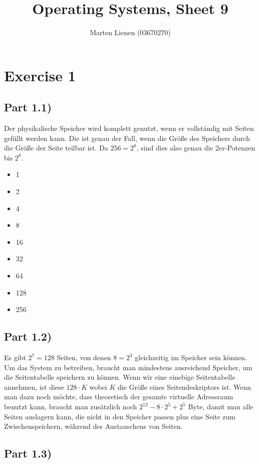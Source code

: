 \documentclass[10pt,a4paper]{article}
\title{Operating Systems, Sheet 9}
\author{Marten Lienen (03670270)}
\begin{document}
\maketitle

\section*{Exercise 1}

\subsection*{Part 1.1)}

Der physikalische Speicher wird komplett genutzt, wenn er vollständig mit Seiten gefüllt werden kann.
Die ist genau der Fall, wenn die Größe des Speichers durch die Größe der Seite teilbar ist.
Da $256 = 2^{8}$, sind dies also genau die $2$er-Potenzen bis $2^{8}$.

\begin{itemize}
\item 1
\item 2
\item 4
\item 8
\item 16
\item 32
\item 64
\item 128
\item 256
\end{itemize}

\subsection*{Part 1.2)}

Es gibt $2^{7} = 128$ Seiten, von denen $8 = 2^{3}$ gleichzeitig im Speicher sein können.
Um das System zu betreiben, braucht man mindestens ausreichend Speicher, um die Seitentabelle speichern zu können.
Wenn wir eine einebige Seitentabelle annehmen, ist diese $128 \cdot K$ wobei $K$ die Größe eines Seitendeskriptors ist.
Wenn man dazu noch möchte, dass theoretisch der gesamte virtuelle Adressraum benutzt kann, braucht man zusätzlich noch $2^{12} - 8 \cdot 2^{5} + 2^{5}$ Byte, damit man alle Seiten auslagern kann, die nicht in den Speicher passen plus eine Seite zum Zwischenspeichern, während des Austauschens von Seiten.

\subsection*{Part 1.3)}
\end{document}
